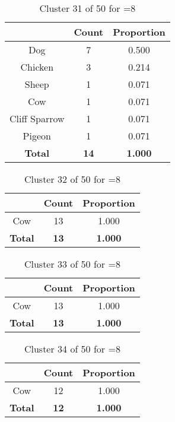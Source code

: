 \begin{table}[ht!]
\centering
\begin{tabular}{|c|c|c|}
\hline
\bf \Spec{} &\bf Count &\bf Proportion\\ \hline \hline
Dog & 7 & 0.500\\ \hline
Chicken & 3 & 0.214\\ \hline
Sheep & 1 & 0.071\\ \hline
Cow & 1 & 0.071\\ \hline
Cliff Sparrow & 1 & 0.071\\ \hline
Pigeon & 1 & 0.071\\ \hline
\hline
\bf Total & \bf 14 & \bf 1.000\\ \hline
\end{tabular}
\label{tab:cluster:31:8}
\caption{Cluster 31 of 50 for \minneigh{}=8}
\end{table}

\begin{table}[ht!]
\centering
\begin{tabular}{|c|c|c|}
\hline
\bf \Spec{} &\bf Count &\bf Proportion\\ \hline \hline
Cow & 13 & 1.000\\ \hline
\hline
\bf Total & \bf 13 & \bf 1.000\\ \hline
\end{tabular}
\label{tab:cluster:32:8}
\caption{Cluster 32 of 50 for \minneigh{}=8}
\end{table}

\begin{table}[ht!]
\centering
\begin{tabular}{|c|c|c|}
\hline
\bf \Spec{} &\bf Count &\bf Proportion\\ \hline \hline
Cow & 13 & 1.000\\ \hline
\hline
\bf Total & \bf 13 & \bf 1.000\\ \hline
\end{tabular}
\label{tab:cluster:33:8}
\caption{Cluster 33 of 50 for \minneigh{}=8}
\end{table}

\begin{table}[ht!]
\centering
\begin{tabular}{|c|c|c|}
\hline
\bf \Spec{} &\bf Count &\bf Proportion\\ \hline \hline
Cow & 12 & 1.000\\ \hline
\hline
\bf Total & \bf 12 & \bf 1.000\\ \hline
\end{tabular}
\label{tab:cluster:34:8}
\caption{Cluster 34 of 50 for \minneigh{}=8}
\end{table}

